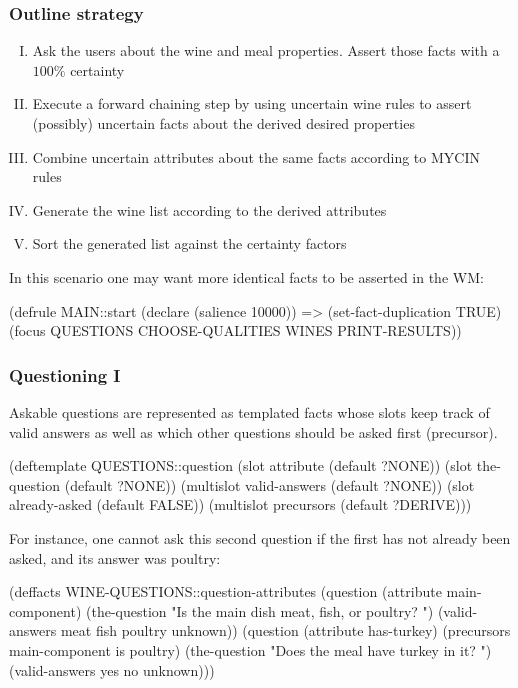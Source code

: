 \documentclass[xcolor={usenames,dvipsnames,svgnames}, compress]{beamer}
\begin{document}
\begin{frame}[fragile]
  \frametitle{Outline strategy}
  \begin{enumerate}[I.]
  \item Ask the users about the wine and meal properties. Assert those
    facts with a $100\%$ certainty
  \item Execute a forward chaining step by using uncertain wine rules to
    assert (possibly) uncertain facts about the derived desired
    properties
  \item Combine uncertain attributes about the same facts according
      to MYCIN rules
  \item Generate the wine list according to the derived attributes
  \item Sort the generated list against the certainty factors
  \end{enumerate}

  In this scenario one may want more identical facts to be asserted in
  the WM:
  \begin{clips-code}[numbers=none]
    (defrule MAIN::start
        (declare (salience 10000))
        =>
        (set-fact-duplication TRUE)
        (focus QUESTIONS CHOOSE-QUALITIES WINES PRINT-RESULTS))
  \end{clips-code}
\end{frame}

\begin{frame}[fragile]
  \frametitle{Questioning I}
  Askable questions are represented as templated facts whose slots
  keep track of valid answers as well as which other questions should
  be asked first (\textsf{precursor}).
  \begin{clips-code}[numbers=none]
    (deftemplate QUESTIONS::question
        (slot attribute (default ?NONE))
        (slot the-question (default ?NONE))
        (multislot valid-answers (default ?NONE))
        (slot already-asked (default FALSE))
        (multislot precursors (default ?DERIVE)))
  \end{clips-code}

  For instance, one cannot ask this second question if the first has
  not already been asked, and its answer was \textsf{poultry}:
  \begin{clips-code}[numbers=none]
    (deffacts WINE-QUESTIONS::question-attributes
        (question (attribute main-component)
                  (the-question "Is the main dish meat, fish, or poultry? ")
                  (valid-answers meat fish poultry unknown))
        (question (attribute has-turkey)
                  (precursors main-component is poultry)
                  (the-question "Does the meal have turkey in it? ")
                  (valid-answers yes no unknown)))
  \end{clips-code}
\end{frame}
\end{document}
